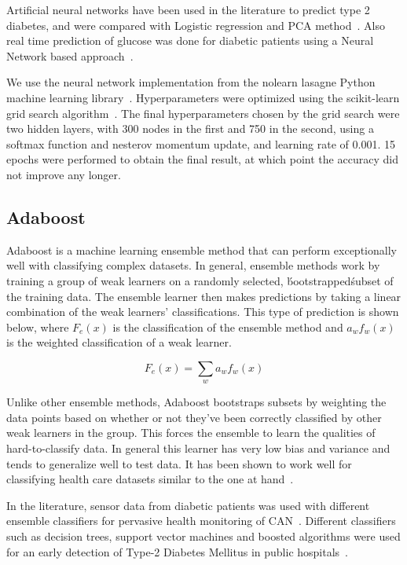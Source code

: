 \documentclass[conference]{IEEEtran}
\begin{document}
Artificial neural networks have been used in the literature to predict type 2 diabetes, and were compared with Logistic regression and PCA method~\cite{mohamed-2002}. Also real time prediction of glucose was done for diabetic patients using a Neural Network based approach~\cite{pappada-2011, zainuddin-2009}.

We use the neural network implementation from the nolearn lasagne Python machine learning library~\cite{nolearn}. Hyperparameters were optimized using the scikit-learn grid search algorithm~\cite{scikit-learn}. The final hyperparameters chosen by the grid search were two hidden layers, with 300 nodes in the first and 750 in the second, using a softmax function and nesterov momentum update, and learning rate of 0.001. 15 epochs were performed to obtain the final result, at which point the accuracy did not improve any longer.

\subsection{Adaboost}

Adaboost is a machine learning ensemble method that can perform exceptionally well with classifying complex datasets. In general, ensemble methods work by training a group of weak learners on a randomly selected, \'bootstrapped\' subset of the training data. The ensemble learner then makes predictions by taking a linear combination of the weak learners' classifications. This type of prediction is shown below, where $F_{e}(x)$ is the classification of the ensemble method and $a_{w}f_{w}(x)$ is the weighted classification of a weak learner.

\[
	F_{e}(x) = \sum_{w} a_{w}f_{w}(x)
\]

Unlike other ensemble methods, Adaboost bootstraps subsets by weighting the data points based on whether or not they've been correctly classified by other weak learners in the group. This forces the ensemble to learn the qualities of hard-to-classify data. In general this learner has very low bias and variance and tends to generalize well to test data. It has been shown to work well for classifying health care datasets similar to the one at hand~\cite{adaboost-breast-cancer}.

In the literature, sensor data from diabetic patients was used with different ensemble classifiers for pervasive health monitoring of CAN~\cite{kelarev-2012}. Different classifiers such as decision trees, support vector machines and boosted algorithms were used for an early detection of Type-2 Diabetes Mellitus in public hospitals~\cite{tama-2011}.
\end{document}
